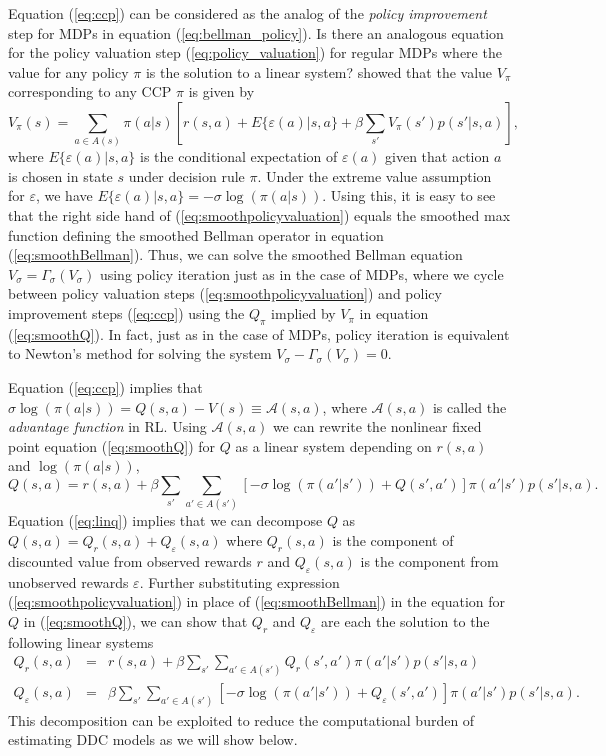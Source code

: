 Equation (\ref{eq:ccp}) can be considered as the analog of the {\it policy improvement\/} step for MDPs
in equation (\ref{eq:bellman_policy}). Is there an analogous equation for the policy valuation 
step (\ref{eq:policy_valuation}) for regular MDPs where the value for any policy
$\pi$ is the solution to a linear system? \citet{AguirregabiriaMira:2002} showed that the value $V_\pi$ 
corresponding to any CCP $\pi$ is given by
\begin{equation}
   V_\pi(s) =\sum_{a \in A(s)} \pi(a|s)[r(s,a)+E\{\varepsilon(a)|s,a\}+\beta \sum_{s'} V_\pi(s')p(s'|s,a)],
\label{eq:smoothpolicyvaluation}
\end{equation}
where $E\{\varepsilon(a)|s,a\}$ is the conditional expectation of $\varepsilon(a)$ given that action $a$ is chosen
in state $s$  under decision rule $\pi$. Under the extreme value assumption for $\varepsilon$, we have
$E\{\varepsilon(a)|s,a\}=-\sigma \log(\pi(a|s))$. Using this, it is easy to see that the right side hand of 
(\ref{eq:smoothpolicyvaluation}) equals the smoothed max function defining the smoothed Bellman operator in equation
(\ref{eq:smoothBellman}). Thus, we can solve the smoothed Bellman equation $V_\sigma=\Gamma_\sigma(V_\sigma)$ using 
policy iteration just as in the case of MDPs, where we cycle between policy valuation steps (\ref{eq:smoothpolicyvaluation})
and policy improvement steps (\ref{eq:ccp}) using the $Q_\pi$ implied by $V_\pi$ in equation (\ref{eq:smoothQ}).
In fact, just as in the case of MDPs, policy iteration is equivalent to Newton's method for solving the
system $V_\sigma-\Gamma_\sigma(V_\sigma)=0$. 


Equation (\ref{eq:ccp}) implies that $\sigma\log(\pi(a|s))=Q(s,a)-V(s)\equiv \mathcal{A}(s,a)$, where
$\mathcal{A}(s,a)$ is called the {\it advantage function\/} in RL. Using $\mathcal{A}(s,a)$ we can rewrite the nonlinear fixed point
equation (\ref{eq:smoothQ}) for $Q$  as a linear system depending  on $r(s,a)$ and $\log(\pi(a|s))$,
\begin{equation}
    Q(s,a) = r(s,a) + \beta \sum_{s'} \sum_{a' \in A(s')} \left[ -\sigma\log(\pi(a'|s'))+Q(s',a')\right]\pi(a'|s')p(s'|s,a).
\label{eq:linq}
\end{equation}
Equation (\ref{eq:linq}) implies that we can decompose $Q$ as $Q(s,a)=Q_r(s,a)+Q_\varepsilon(s,a)$ where $Q_r(s,a)$ is the component 
of discounted value from observed rewards $r$ and $Q_\varepsilon(s,a)$ is the component from unobserved rewards $\varepsilon$.
Further substituting expression (\ref{eq:smoothpolicyvaluation}) in place of (\ref{eq:smoothBellman}) in the equation for
$Q$ in (\ref{eq:smoothQ}), we can show that $Q_r$ and $Q_\varepsilon$ are each the solution to the following linear systems
\begin{eqnarray}
     Q_r(s,a)&=&r(s,a)+\beta \sum_{s'} \sum_{a' \in A(s')} Q_r(s',a')\pi(a'|s')p(s'|s,a) \label{eq:Qr} \\
     Q_\varepsilon(s,a)&=&\beta \sum_{s'} \sum_{a' \in A(s')}\left[-\sigma\log(\pi(a'|s'))+ Q_\varepsilon(s',a')\right]\pi(a'|s')p(s'|s,a).
\label{eq:Qeps}
\end{eqnarray}
This decomposition can be exploited to reduce the computational burden of estimating DDC models
as we will show below.

